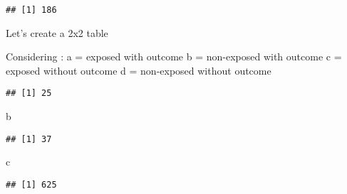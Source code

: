 \documentclass[
]{article}
\newenvironment{Shaded}{\begin{snugshade}}{\end{snugshade}}
\newcommand{\FunctionTok}[1]{\textcolor[rgb]{0.13,0.29,0.53}{\textbf{#1}}}
\newcommand{\NormalTok}[1]{#1}
\newcommand{\OtherTok}[1]{\textcolor[rgb]{0.56,0.35,0.01}{#1}}
\newcommand{\SpecialCharTok}[1]{\textcolor[rgb]{0.81,0.36,0.00}{\textbf{#1}}}
\newcommand{\StringTok}[1]{\textcolor[rgb]{0.31,0.60,0.02}{#1}}
\begin{document}
\begin{verbatim}
## [1] 186
\end{verbatim}

Let's create a 2x2 table

Considering : a = exposed with outcome b = non-exposed with outcome c =
exposed without outcome d = non-exposed without outcome

\begin{Shaded}
\end{Shaded}

\begin{verbatim}
## [1] 25
\end{verbatim}

\begin{Shaded}
\begin{Highlighting}[]
\NormalTok{b}
\end{Highlighting}
\end{Shaded}

\begin{verbatim}
## [1] 37
\end{verbatim}

\begin{Shaded}
\begin{Highlighting}[]
\NormalTok{c}
\end{Highlighting}
\end{Shaded}

\begin{verbatim}
## [1] 625
\end{verbatim}
\end{document}

